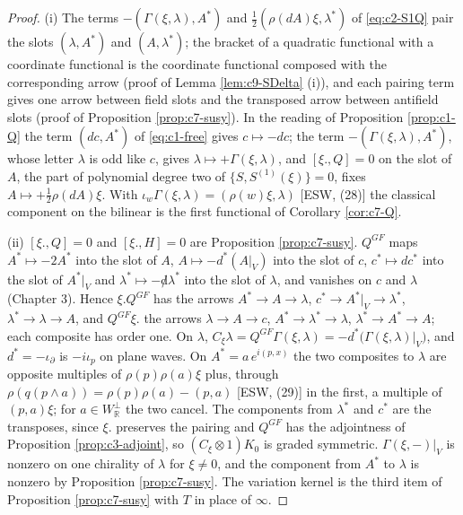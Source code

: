 \begin{proof}
(i) The terms $-(\Gamma(\xi,\lambda),A^*)$ and $\tfrac12(\rho(dA)\xi,\lambda^*)$ of \eqref{eq:c2-S1Q} pair the slots $(\lambda,A^*)$ and $(A,\lambda^*)$; the bracket of a quadratic functional with a coordinate functional is the coordinate functional composed with the corresponding arrow (proof of Lemma \ref{lem:c9-SDelta} (i)), and each pairing term gives one arrow between field slots and the transposed arrow between antifield slots (proof of Proposition \ref{prop:c7-susy}). In the reading of Proposition \ref{prop:c1-Q} the term $(dc,A^*)$ of \eqref{eq:c1-free} gives $c\mapsto-dc$; the term $-(\Gamma(\xi,\lambda),A^*)$, whose letter $\lambda$ is odd like $c$, gives $\lambda\mapsto+\Gamma(\xi,\lambda)$, and $[\xi.,Q]=0$ on the slot of $A$, the part of polynomial degree two of $\{S,S^{(1)}(\xi)\}=0$, fixes $A\mapsto+\tfrac12\rho(dA)\xi$. With $\iota_w\Gamma(\xi,\lambda)=(\rho(w)\xi,\lambda)$ [ESW, (28)] the classical component on the bilinear is the first functional of Corollary \ref{cor:c7-Q}.

(ii) $[\xi.,Q]=0$ and $[\xi.,H]=0$ are Proposition \ref{prop:c7-susy}. $Q^{GF}$ maps $A^*\mapsto-2A^*$ into the slot of $A$, $A\mapsto-d^*(A|_V)$ into the slot of $c$, $c^*\mapsto dc^*$ into the slot of $A^*|_V$ and $\lambda^*\mapsto-{\not d}\lambda^*$ into the slot of $\lambda$, and vanishes on $c$ and $\lambda$ (Chapter 3). Hence $\xi.Q^{GF}$ has the arrows $A^*\to A\to\lambda$, $c^*\to A^*|_V\to\lambda^*$, $\lambda^*\to\lambda\to A$, and $Q^{GF}\xi.$ the arrows $\lambda\to A\to c$, $A^*\to\lambda^*\to\lambda$, $\lambda^*\to A^*\to A$; each composite has order one. On $\lambda$, $C_\xi\lambda=Q^{GF}\Gamma(\xi,\lambda)=-d^*\big(\Gamma(\xi,\lambda)|_V\big)$, and $d^*=-\iota_\partial$ is $-i\iota_p$ on plane waves. On $A^*=a\,e^{i(p,x)}$ the two composites to $\lambda$ are opposite multiples of $\rho(p)\rho(a)\xi$ plus, through $\rho(q(p\wedge a))=\rho(p)\rho(a)-(p,a)$ [ESW, (29)] in the first, a multiple of $(p,a)\xi$; for $a\in W_{\mathbb R}^\perp$ the two cancel. The components from $\lambda^*$ and $c^*$ are the transposes, since $\xi.$ preserves the pairing and $Q^{GF}$ has the adjointness of Proposition \ref{prop:c3-adjoint}, so $(C_\xi\otimes1)K_0$ is graded symmetric. $\Gamma(\xi,-)|_V$ is nonzero on one chirality of $\lambda$ for $\xi\neq0$, and the component from $A^*$ to $\lambda$ is nonzero by Proposition \ref{prop:c7-susy}. The variation kernel is the third item of Proposition \ref{prop:c7-susy} with $T$ in place of $\infty$.


\end{proof}

